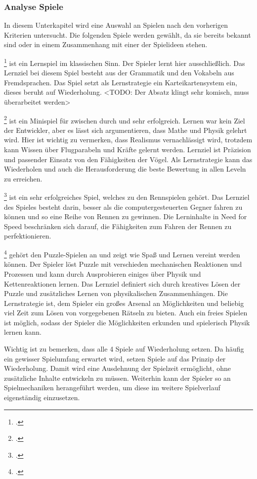 	\subsubsection{Analyse Spiele}\label{sssec:lernspielanalyse}
		In diesem Unterkapitel wird eine Auswahl an Spielen nach den vorherigen Kriterien untersucht. Die folgenden Spiele werden gewählt, da sie bereits bekannt sind oder in einem Zusammenhang mit einer der Spielideen stehen.
		\begin{description}\obeylines
			\item[Gut]{
				\footcite{game-gut} ist ein Lernspiel im klassischen Sinn. Der Spieler lernt hier ausschließlich.
				Das Lernziel bei diesem Spiel besteht aus der Grammatik und den Vokabeln aus Fremdsprachen.
				Das Spiel setzt als Lernstrategie ein Karteikartensystem ein, dieses beruht auf Wiederholung.
			}
			<TODO: Der Absatz klingt sehr komisch, muss überarbeitet werden>
			\item[Angry Birds]{
				\footcite{game-angrybirds} ist ein Minispiel für zwischen durch und sehr erfolgreich. Lernen war kein Ziel der Entwickler, aber es lässt sich argumentieren, dass Mathe und Physik gelehrt wird. Hier ist wichtig zu vermerken, dass Realismus vernachlässigt wird, trotzdem kann Wissen über Flugparabeln und Kräfte gelernt werden.
				Lernziel ist Präzision und passender Einsatz von den Fähigkeiten der Vögel.
				Als Lernstrategie kann das Wiederholen und auch die Herausforderung die beste Bewertung in allen Leveln zu erreichen.
			}
			\item[Need for Speed]{
				\footcite{game-nfs} ist ein sehr erfolgreiches Spiel, welches zu den Rennspielen gehört.
				Das Lernziel des Spieles besteht darin, besser als die computergesteuerten Gegner fahren zu können und so eine Reihe von Rennen zu gewinnen.
				Die Lerninhalte in Need for Speed beschränken sich darauf, die Fähigkeiten zum Fahren der Rennen zu perfektionieren.
			}
			\item[Crazy Machines]{
				\footcite{game-crazymachine} gehört den Puzzle-Spielen an und zeigt wie Spaß und Lernen vereint werden können. Der Spieler löst Puzzle mit verschieden mechanischen Reaktionen und Prozessen und kann durch Ausprobieren einiges über Physik und Kettenreaktionen lernen.
				Das Lernziel definiert sich durch kreatives Lösen der Puzzle und zusätzliches Lernen von physikalischen Zusammenhängen.
				Die Lernstrategie ist, dem Spieler ein großes Arsenal an Möglichkeiten und beliebig viel Zeit zum Lösen von vorgegebenen Rätseln zu bieten. Auch ein freies Spielen ist möglich, sodass der Spieler die Möglichkeiten erkunden und spielerisch Physik lernen kann.
				}
		\end{description}
		Wichtig ist zu bemerken, dass alle 4 Spiele auf Wiederholung setzen. Da häufig ein gewisser Spielumfang erwartet wird, setzen Spiele auf das Prinzip der Wiederholung. Damit wird eine Ausdehnung der Spielzeit ermöglicht, ohne zusätzliche Inhalte entwickeln zu müssen. Weiterhin kann der Spieler so an Spielmechaniken herangeführt werden, um diese im weitere Spielverlauf eigenständig einzusetzen.

